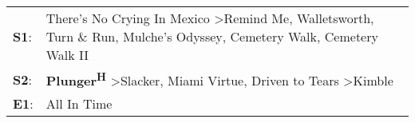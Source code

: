 \begin{supertabular}{p{0.03\textwidth}p{0.92\textwidth}}
 \textbf{S1}:  &  There's No Crying In Mexico\textsuperscript{} \textgreater \enspace Remind Me\textsuperscript{}, \enspace Walletsworth\textsuperscript{}, \enspace Turn \& Run\textsuperscript{}, \enspace Mulche's Odyssey\textsuperscript{}, \enspace Cemetery Walk\textsuperscript{}, \enspace Cemetery Walk II\textsuperscript{}  \enspace  \\
 \textbf{S2}:  &                                                                                               \textbf{Plunger\textsuperscript{H}} \textgreater \enspace Slacker\textsuperscript{}, \enspace Miami Virtue\textsuperscript{}, \enspace Driven to Tears\textsuperscript{} \textgreater \enspace Kimble\textsuperscript{}  \enspace  \\
 \textbf{E1}:  &                                                                                                                                                                                                                                                                                         All In Time\textsuperscript{}  \enspace  \\
\end{supertabular}
